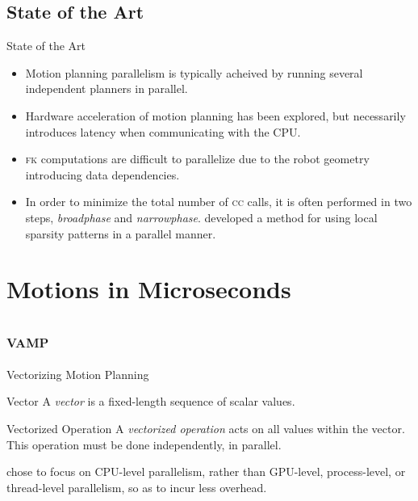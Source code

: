 \documentclass{beamer}
\begin{document}
\subsection{State of the Art}

\begin{frame}{State of the Art}
\begin{itemize}
\item Motion planning parallelism is typically acheived by running several independent planners in parallel. %
\item Hardware acceleration of motion planning has been explored, but necessarily introduces latency when communicating with the CPU.
\item \textsc{fk} computations are difficult to parallelize due to the robot geometry introducing data dependencies.
\item In order to minimize the total number of \textsc{cc} calls, it is often performed in two steps, \textit{broadphase} and \textit{narrowphase}. \cite{paper:eemp} developed a method for using local sparsity patterns in a parallel manner.
\end{itemize}
\end{frame}

\section{Motions in Microseconds}

\subsection{\textsc{vamp}}


\begin{frame}{Vectorizing Motion Planning}
\pause
\begin{block}{Vector}
A \textit{vector} is a fixed-length sequence of scalar values.
\end{block}

\begin{block}{Vectorized Operation}
A \textit{vectorized operation} acts on all values within the vector. This operation must be done independently, in parallel.
\end{block}

\pause
\cite{paper:MiM} chose to focus on CPU-level parallelism, rather than GPU-level, process-level, or thread-level parallelism, so as to incur less overhead.
\end{frame}
\end{document}
